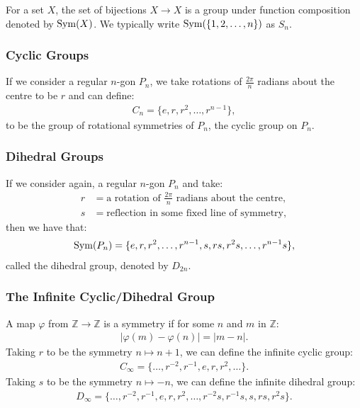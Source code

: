 For a set $X$, the set of bijections $X \to X$ is a group under function
composition denoted by $\operatorname{Sym}(X)$. We typically write 
$\operatorname{Sym}(\{1, 2, \ldots, n\})$ as $S_n$.

\subsubsection{Cyclic Groups}

If we consider a regular $n$-gon $P_n$, we take rotations of
$\frac{2\pi}{n}$ radians about the centre to be $r$ and can define: \begin{align*}
    C_n = \{e, r, r^2, \ldots, r^{n - 1}\},
\end{align*} to be the group of rotational symmetries of $P_n$, the cyclic
group on $P_n$.

\subsubsection{Dihedral Groups}

If we consider again, a regular $n$-gon $P_n$ and take: \begin{align*}
    r &= \text{a rotation of } \frac{2\pi}{n} \text{ radians about the centre}, \\
    s &= \text{reflection in some fixed line of symmetry},
\end{align*} then we have that: \begin{align*}
    \operatorname{Sym}(P_n) = \{e, r, r^2, \ldots, r^{n - 1}, s, rs, r^2s, \ldots, r^{n - 1}s\},
\end{align*} called the dihedral group, denoted by $D_{2n}$.

\subsubsection{The Infinite Cyclic/Dihedral Group}

A map $\varphi$ from $\mathbb{Z} \to \mathbb{Z}$ is a symmetry if for some
$n$ and $m$ in $\mathbb{Z}$: \begin{align*}
    |\varphi(m) - \varphi(n)| = |m - n|.
\end{align*} Taking $r$ to be the symmetry $n \mapsto n + 1$, we can define the
infinite cyclic group: \begin{align*}
    C_\infty = \{\ldots, r^{-2}, r^{-1}, e, r, r^2, \ldots\}.
\end{align*} Taking $s$ to be the symmetry $n \mapsto -n$, we can define the
infinite dihedral group: \begin{align*}
    D_\infty = \{\ldots, r^{-2}, r^{-1}, e, r, r^2, \ldots, r^{-2}s, r^{-1}s, s, rs, r^2s\}.
\end{align*}

